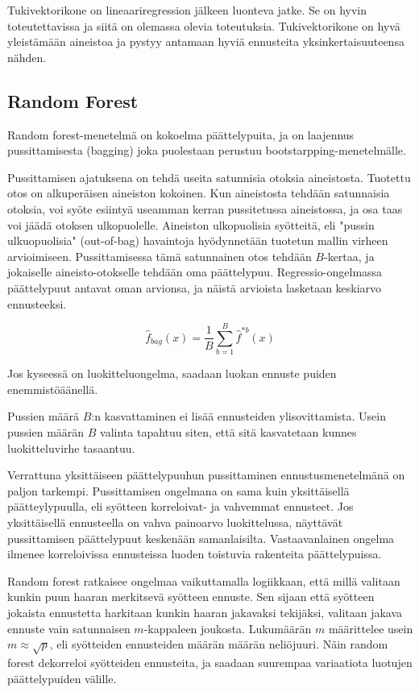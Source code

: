 \documentclass[finnish,twoside,openright]{HYgraduMLDS}
\begin{document}
Tukivektorikone on lineaariregression jälkeen luonteva jatke. Se on hyvin toteutettavissa ja siitä on olemassa olevia toteutuksia. Tukivektorikone on hyvä yleistämään aineistoa ja pystyy antamaan hyviä ennusteita yksinkertaisuuteensa nähden.


\subsection{Random Forest}

Random forest-menetelmä on kokoelma päättelypuita, ja on laajennus pussittamisesta (bagging)\cite{james2013ISLR} joka puolestaan perustuu bootstarpping-menetelmälle. 

Pussittamisen ajatuksena on tehdä useita satunnisia otoksia aineistosta. Tuotettu otos on alkuperäisen aineiston kokoinen. Kun aineistosta tehdään satunnaisia otoksia, voi syöte esiintyä useamman kerran pussitetussa aineistossa, ja osa taas voi jäädä otoksen ulkopuolelle. Aineiston ulkopuolisia syötteitä, eli "pussin ulkuopuolisia"  (out-of-bag) havaintoja hyödynnetään tuotetun mallin virheen arvioimiseen. Pussittamisessa tämä satunnainen otos tehdään $B$-kertaa, ja jokaiselle aineisto-otokselle tehdään oma päättelypuu. Regressio-ongelmassa päättelypuut antavat oman arvionsa, ja näistä arvioista lasketaan keskiarvo ennusteeksi.

\begin{equation}
    \hat{f}_{bag}(x) = \frac{1}{B} \sum^B_{b=1} \hat{f}^{*b}(x)
\end{equation}

Jos kyseessä on luokitteluongelma, saadaan luokan ennuste puiden enemmistöäänellä.\cite{james2013ISLR} 

Pussien määrä $B$:n kasvattaminen ei lisää ennusteiden ylisovittamista\cite{james2013ISLR}. Usein pussien määrän $B$ valinta tapahtuu siten, että sitä kasvatetaan kunnes luokitteluvirhe tasaantuu. 

Verrattuna yksittäiseen päättelypuuhun pussittaminen ennustusmenetelmänä on paljon tarkempi. Pussittamisen ongelmana on sama kuin yksittäisellä päätteylypuulla, eli syötteen korreloivat- ja vahvemmat ennusteet. Jos yksittäisellä ennusteella on vahva painoarvo luokittelussa, näyttävät pussittamisen päättelypuut keskenään samanlaisilta. Vastaavanlainen ongelma ilmenee korreloivissa ennusteissa luoden toistuvia rakenteita päättelypuissa.

Random forest ratkaisee ongelmaa vaikuttamalla logiikkaan, että millä valitaan kunkin puun haaran merkitsevä syötteen ennuste. Sen sijaan että syötteen jokaista ennustetta harkitaan kunkin haaran jakavaksi tekijäksi, valitaan jakava ennuste vain satunnaisen $m$-kappaleen joukosta. Lukumäärän $m$ määrittelee usein $m \approx \sqrt{p}$, eli syötteiden ennusteiden määrän määrän neliöjuuri. Näin random forest dekorreloi syötteiden ennusteita, ja saadaan suurempaa variaatiota luotujen päättelypuiden välille\cite{james2013ISLR}.
\end{document}
